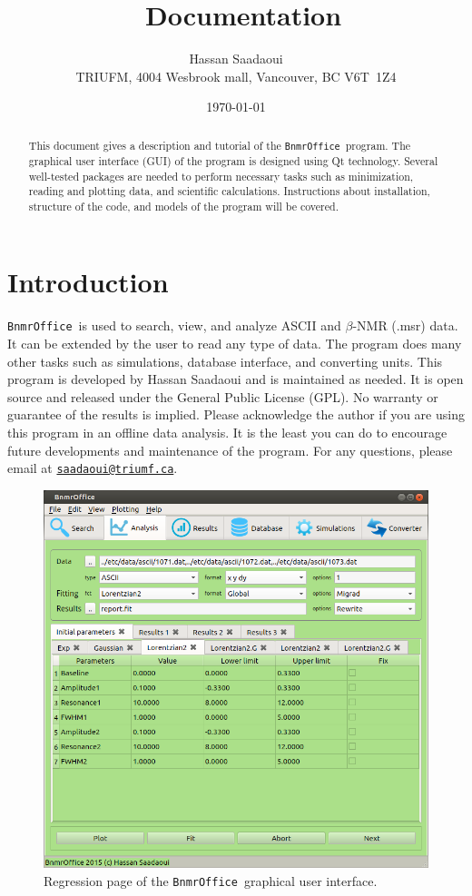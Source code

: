 \documentclass[10pt,letterpaper,oneside]{article}
\title{\bof\ Documentation}
\author{Hassan Saadaoui \\
\small{TRIUFM, 4004 Wesbrook mall, Vancouver, BC V6T~1Z4} \\
\small{\myemail}}
\date{\today}
\makeatletter
\newcommand{\bof}{\texttt{BnmrOffice}}
\newcommand{\myemail}{\texttt{\href{mailto:saadaoui@triumf.ca}{saadaoui@triumf.ca}}}
\makeatother
\begin{document}
\maketitle

\begin{abstract}
 \noindent \normalsize
 This document gives a description and tutorial of the \bof\ program.  The  graphical user interface (GUI) of the program is designed using Qt technology. Several well-tested packages are needed to perform necessary tasks such as minimization, reading and plotting data, and scientific  calculations. Instructions about installation, structure of the code, and models of the program will be covered. 
\end{abstract}
\pagebreak
\tableofcontents
\pagebreak

\section{Introduction}
\bof\ is used to search, view, and analyze ASCII and $\beta$-NMR (.msr) data. It can be extended by the user to read any type of data. The program does many other tasks such as simulations, database interface, and converting units. This program is developed by Hassan Saadaoui and is maintained as needed. It is open source and released under the General Public License (GPL). No warranty or guarantee of the results is implied. Please acknowledge the author if you are using this program in an offline data analysis. It is the least you can do to encourage future developments and maintenance of the program. For any questions, please email at \myemail.

\begin{figure}[h]
\includegraphics[width=\textwidth]{bnmroffice.png}
 \caption{Regression page of the \bof\ graphical user interface.}
 \label{fig-dep}
 \end{figure}
\end{document}
